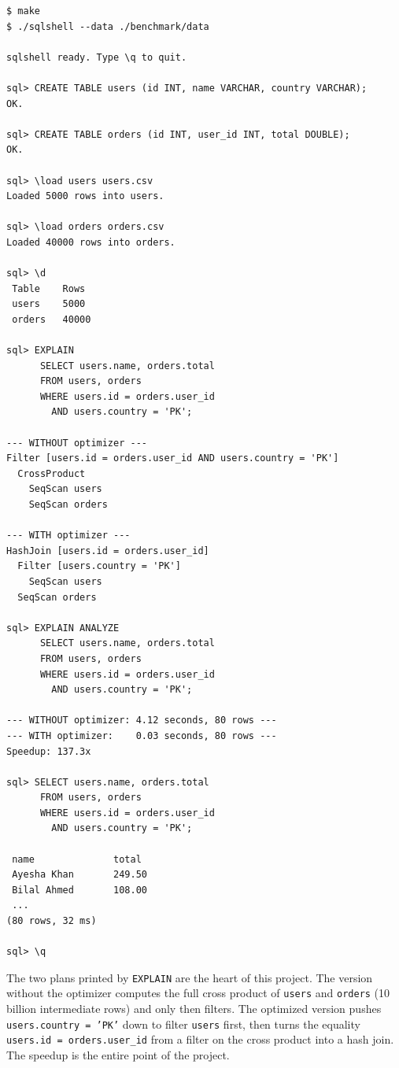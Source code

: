\documentclass[11pt,a4paper]{article}
\begin{document}
\begin{codebox}
\begin{lstlisting}
$ make
$ ./sqlshell --data ./benchmark/data

sqlshell ready. Type \q to quit.

sql> CREATE TABLE users (id INT, name VARCHAR, country VARCHAR);
OK.

sql> CREATE TABLE orders (id INT, user_id INT, total DOUBLE);
OK.

sql> \load users users.csv
Loaded 5000 rows into users.

sql> \load orders orders.csv
Loaded 40000 rows into orders.

sql> \d
 Table    Rows
 users    5000
 orders   40000

sql> EXPLAIN
      SELECT users.name, orders.total
      FROM users, orders
      WHERE users.id = orders.user_id
        AND users.country = 'PK';

--- WITHOUT optimizer ---
Filter [users.id = orders.user_id AND users.country = 'PK']
  CrossProduct
    SeqScan users
    SeqScan orders

--- WITH optimizer ---
HashJoin [users.id = orders.user_id]
  Filter [users.country = 'PK']
    SeqScan users
  SeqScan orders

sql> EXPLAIN ANALYZE
      SELECT users.name, orders.total
      FROM users, orders
      WHERE users.id = orders.user_id
        AND users.country = 'PK';

--- WITHOUT optimizer: 4.12 seconds, 80 rows ---
--- WITH optimizer:    0.03 seconds, 80 rows ---
Speedup: 137.3x

sql> SELECT users.name, orders.total
      FROM users, orders
      WHERE users.id = orders.user_id
        AND users.country = 'PK';

 name              total
 Ayesha Khan       249.50
 Bilal Ahmed       108.00
 ...
(80 rows, 32 ms)

sql> \q
\end{lstlisting}
\end{codebox}

The two plans printed by \texttt{EXPLAIN} are the heart of this project. The version without the optimizer computes the full cross product of \texttt{users} and \texttt{orders} (10 billion intermediate rows) and only then filters. The optimized version pushes \texttt{users.country = 'PK'} down to filter \texttt{users} first, then turns the equality \texttt{users.id = orders.user\_id} from a filter on the cross product into a hash join. The speedup is the entire point of the project.
\end{document}

